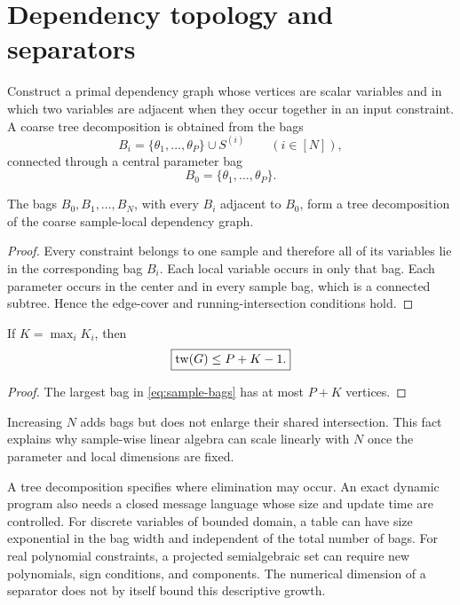 \section{Dependency topology and separators}
\label{sec:topology}

Construct a primal dependency graph whose vertices are scalar variables and in
which two variables are adjacent when they occur together in an input
constraint.  A coarse tree decomposition is obtained from the bags
\begin{equation}
  B_i=\{\theta_1,\ldots,\theta_P\}\cup S^{(i)}
  \qquad(i\in[N]),
  \label{eq:sample-bags}
\end{equation}
connected through a central parameter bag
\begin{equation}
  B_0=\{\theta_1,\ldots,\theta_P\}.
\end{equation}

\begin{proposition}
\label{prop:star-decomposition}
The bags \(B_0,B_1,\ldots,B_N\), with every \(B_i\) adjacent to \(B_0\), form
a tree decomposition of the coarse sample-local dependency graph.
\end{proposition}

\begin{proof}
Every constraint belongs to one sample and therefore all of its variables lie
in the corresponding bag \(B_i\).  Each local variable occurs in only that bag.
Each parameter occurs in the center and in every sample bag, which is a
connected subtree.  Hence the edge-cover and running-intersection conditions
hold.
\end{proof}

\begin{corollary}
\label{cor:treewidth}
If \(K=\max_iK_i\), then
\begin{equation}
  \boxed{\operatorname{tw}(G)\le P+K-1.}
\end{equation}
\end{corollary}

\begin{proof}
The largest bag in \cref{eq:sample-bags} has at most \(P+K\) vertices.
\end{proof}

Increasing \(N\) adds bags but does not enlarge their shared intersection.
This fact explains why sample-wise linear algebra can scale linearly with
\(N\) once the parameter and local dimensions are fixed.

\begin{remark}
A tree decomposition specifies where elimination may occur.  An exact dynamic
program also needs a closed message language whose size and update time are
controlled.  For discrete variables of bounded domain, a table can have size
exponential in the bag width and independent of the total number of bags.  For
real polynomial constraints, a projected semialgebraic set can require new
polynomials, sign conditions, and components.  The numerical dimension of a
separator does not by itself bound this descriptive growth.
\end{remark}

